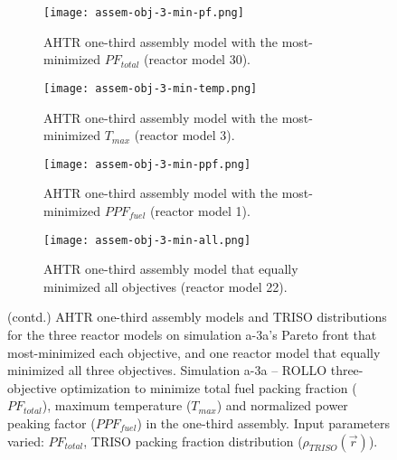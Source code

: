 \begin{figure}[htbp!]
    \ContinuedFloat
    \begin{subfigure}{0.49\textwidth}
        \centering
        \texttt{[image: assem-obj-3-min-pf.png]}
        \caption{\gls{AHTR} one-third assembly model with the most-minimized $PF_{total}$ 
        (reactor model 30).}
        \label{fig:assem-obj-3-min-pf} 
    \end{subfigure}
    \begin{subfigure}{0.49\textwidth}
        \centering
        \texttt{[image: assem-obj-3-min-temp.png]}
        \caption{\gls{AHTR} one-third assembly model with the most-minimized $T_{max}$
        (reactor model 3).}
        \label{fig:assem-obj-3-min-temp} 
    \end{subfigure}
    \begin{subfigure}{0.49\textwidth}
        \centering
        \texttt{[image: assem-obj-3-min-ppf.png]}
        \caption{\gls{AHTR} one-third assembly model with the most-minimized $PPF_{fuel}$
        (reactor model 1).}
        \label{fig:assem-obj-3-min-ppf} 
    \end{subfigure}
    \begin{subfigure}{0.49\textwidth}
        \centering
        \texttt{[image: assem-obj-3-min-all.png]}
        \caption{\gls{AHTR} one-third assembly model that equally minimized all objectives
        (reactor model 22).}
        \label{fig:assem-obj-3-min-all} 
    \end{subfigure}
    \begin{subfigure}{.4\textwidth}
    \vspace{1cm}
    \centering
\end{subfigure}
    \caption{(contd.) AHTR one-third assembly models and TRISO distributions for the 
    three reactor models on simulation a-3a's Pareto front that most-minimized each 
    objective, and one reactor model that equally minimized all three objectives.
    Simulation a-3a -- ROLLO three-objective optimization to minimize total fuel packing 
    fraction ($PF_{total}$), maximum temperature ($T_{max}$) and 
    normalized power peaking factor ($PPF_{fuel}$) in the one-third assembly. 
    Input parameters varied: $PF_{total}$, TRISO packing fraction distribution
    ($\rho_{TRISO}(\vec{r})$).}
\end{figure}

